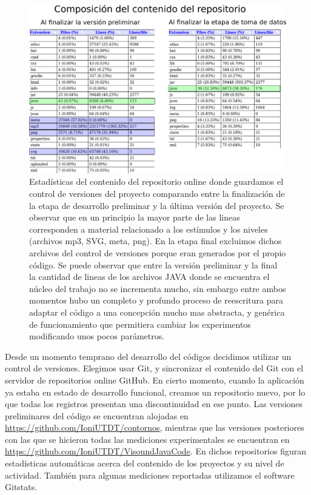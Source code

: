 \documentclass{article}
\begin{document}
    \begin{figure}
        \center
        \includegraphics[width=\textwidth]{Imagenes/Lineas.png}
        \caption{Estadísticas del contenido del repositorio online donde guardamos el control de versiones del proyecto comparando entre la finalización de la etapa de desarrollo preliminar y la última versión del proyecto. Se observar que en un principio la mayor parte de las lineas corresponden a material relacionado a los estímulos y los niveles (archivos mp3, SVG, meta, png). En la etapa final excluimos dichos archivos del control de versiones porque eran generados por el propio código. Se puede observar que entre la versión preliminar y la final la cantidad de lineas de los archivos JAVA donde se encuentra el núcleo del trabajo no se incrementa mucho, sin embargo entre ambos momentos hubo un completo y profundo proceso de reescritura para adaptar el código a una concepción mucho mas abstracta, y genérica de funcionamiento que permitiera cambiar los experimentos modificando unos pocos parámetros.}
        \label{fig:Lineas}
    \end{figure}
        
    Desde un momento temprano del desarrollo del códigos decidimos utilizar un control de versiones. Elegimos usar Git, y sincronizar el contenido del Git con el servidor de repositorios online GitHub. En cierto momento, cuando la aplicación ya estaba en estado de desarrollo funcional, creamos un repositorio nuevo, por lo que todas los registros presentan una discontinuidad en ese punto. Las versiones preliminares del código se encuentran alojadas en \url{https://github.com/IoniUTDT/contornos}, mientras que las versiones posteriores con las que se hicieron todas las mediciones experimentales se encuentran en \url{https://github.com/IoniUTDT/VisoundJavaCode}. En dichos repositorios figuran estadísticas automáticas acerca del contenido de los proyectos y su nivel de actividad. También para algunas mediciones reportadas utilizamos el software Gitstats.
    
\end{document}
